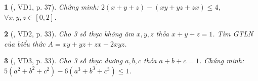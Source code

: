 \documentclass{article}
\newtheorem{baitoan}{}
\begin{document}
\begin{baitoan}[\cite{Kien_dai_so_9}, VD1, p. 37]
	Chứng minh: $2(x + y + z) - (xy + yz + zx)\le4$, $\forall x,y,z\in[0,2]$.
\end{baitoan}

\begin{baitoan}[\cite{Kien_dai_so_9}, VD2, p. 33]
	Cho 3 số thực không âm $x,y,z$ thỏa $x + y + z = 1$. Tìm {\rm GTLN} của biểu thức $A = xy + yz + zx - 2xyz$.
\end{baitoan}

\begin{baitoan}[\cite{Kien_dai_so_9}, VD3, p. 33]
	Cho 3 số thực dương $a,b,c$ thỏa $a + b + c = 1$. Chứng minh: $5(a^2 + b^2 + c^2) - 6(a^3 + b^3 + c^3)\le1$.
\end{baitoan}


\printbibliography[heading=bibintoc]
	
\end{document}
